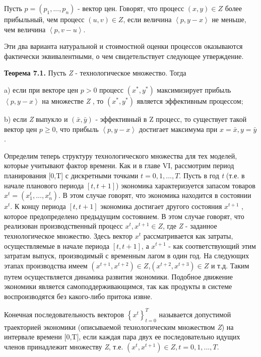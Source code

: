 \documentclass[12pt, 4paper]{book}
\begin{document}
{Пусть $p=(p_1,...,p_n)$ - вектор цен. Говорят, что процесс $(x,y) \in Z$ более прибыльный, чем процесс $(u,v)\in Z$, если величина $\left\langle p,y-x \right\rangle$ не меньше, чем величина $\left\langle p,v-u \right\rangle$.
\par

Эти два варианта натуральной и стоимостной оценки процессов оказываются фактически эквивалентными, о чем свидетельствует следующее утверждение.
\par

\textbf{Теорема 7.1.} Пусть \textit{Z} - технологическое множество. Тогда 
\par

a) если при векторе цен $p> 0$ процесс $(x^{*},y^{*})$ максимизирует прибыль $\left\langle p,y-x \right\rangle$ на множестве \textit{Z} , то $(x^{*},y^{*})$ является эффективным процессом; 
\par

b) если \textit{Z} выпукло и $(\bar{x},\bar{y})$ - эффективный в Z процесс, то существует такой вектор цен $p \geq 0$, что прибыль $\left\langle p,y - x\right\rangle$ достигает максимума при $x=\bar{x}, y= \bar{y}$.
\par

Определим теперь структуру технологического множества для тех моделей, которые учитывают фактор времени. Как и в главе VI, рассмотрим период планирования [0,T] с дискретными точками $t=0,1,...,T$. Пусть в год \textit{t} (т.е. в начале планового периода $[t,t+1]$) экономика характеризуется запасом товаров $x^t=(x_{1}^t,...,x_{n}^t)$. В этом случае говорят, что экономика находится в состоянии $x^t$. К концу периода $[t,t+1]$ экономика достигает другого состояния $x^{t+1}$ , которое предопределено предыдущим состоянием. В этом случае говорят, что реализован производственный процесс ${x^t,x^{t+1}}\in Z$, где \textit{Z} - заданное технологическое множество. Здесь вектор $x^t$ рассматривается как затраты, осуществляемые в начале периода $[t,t+1]$, а $x^{t+1}$ - как соответствующий этим затратам выпуск, производимый с временным лагом в один год. На следующих этапах производства имеем $(x^{t+1},x^{t+2})\in Z$,$(x^{t+2},x^{t+3})\in Z$ и т.д. Таким путем осуществляется динамика развития экономики. Подобное движение экономики является самоподдерживающимся, так как продукты в системе воспроизводятся без какого-либо притока извне.
\par

Конечная последовательность векторов $\left\{x^t\right\}_{t=0}^{T}$ называется допустимой траекторией экономики (описываемой технологическим множеством \textit{Z}) на интервале времени [0,T], если каждая пара двух ее последовательно идущих членов принадлежит множеству \textit{Z}, т.е. $(x^t,x^{t+1}) \in Z, t=0,1,...,T$.
\par

}
\end{document}
